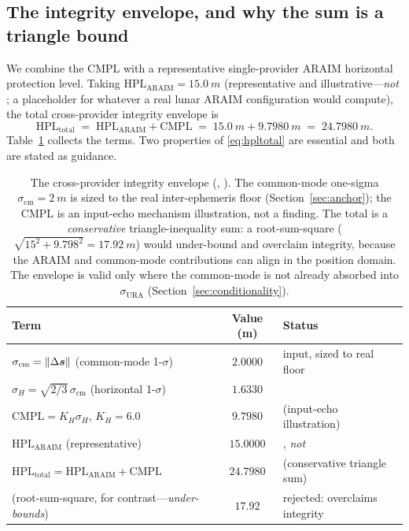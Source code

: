 \subsection{The integrity envelope, and why the sum is a triangle bound}
\label{sec:envelope}

We combine the CMPL with a representative single-provider ARAIM horizontal protection
level. Taking $\mathrm{HPL}_{\mathrm{ARAIM}}=\SI{15.0}{m}$ (representative and
illustrative---\emph{not} \Validated{}; a placeholder for whatever a real lunar ARAIM
configuration would compute), the total cross-provider integrity envelope is
\begin{equation}
  \mathrm{HPL}_{\mathrm{total}}
  \;=\; \mathrm{HPL}_{\mathrm{ARAIM}} + \mathrm{CMPL}
  \;=\; \SI{15.0}{m} + \SI{9.7980}{m}
  \;=\; \SI{24.7980}{m}.
  \label{eq:hpltotal}
\end{equation}
Table~\ref{tab:envelope} collects the terms. Two properties of \eqref{eq:hpltotal} are
essential and both are stated as \Modelled{} guidance.

\begin{table}[t]
\centering
\caption{The cross-provider integrity envelope (\Modelled{}, \modtag{}). The
common-mode one-sigma $\sigma_{\mathrm{cm}}=\SI{2}{m}$ is sized to the real
inter-ephemeris floor (Section~\ref{sec:anchor}); the CMPL is an input-echo mechanism
illustration, not a finding. The total is a \emph{conservative} triangle-inequality sum:
a root-sum-square ($\sqrt{15^2+9.798^2}=\SI{17.92}{m}$) would under-bound and overclaim
integrity, because the ARAIM and common-mode contributions can align in the position
domain. The envelope is valid only where the common-mode is not already absorbed into
$\sigma_{\mathrm{URA}}$ (Section~\ref{sec:conditionality}).}
\label{tab:envelope}
\small
\begin{tabular}{@{}lcl@{}}
\toprule
\textbf{Term} & \textbf{Value (m)} & \textbf{Status} \\
\midrule
$\sigma_{\mathrm{cm}}=\|\Delta\bm{s}\|$ (common-mode 1-$\sigma$) & $2.0000$ & \Modelled{} input, sized to real floor \\
$\sigma_H=\sqrt{2/3}\,\sigma_{\mathrm{cm}}$ (horizontal 1-$\sigma$)   & $1.6330$ & \Modelled{} \\
$\mathrm{CMPL}=K_H\sigma_H$, $K_H=6.0$    & $9.7980$ & \Modelled{} (input-echo illustration) \\
$\mathrm{HPL}_{\mathrm{ARAIM}}$ (representative)          & $15.0000$ & \Modelled{}, \emph{not} \Validated{} \\
$\mathrm{HPL}_{\mathrm{total}}=\mathrm{HPL}_{\mathrm{ARAIM}}+\mathrm{CMPL}$ & $24.7980$ & \Modelled{} (conservative triangle sum) \\
\midrule
(root-sum-square, for contrast---\emph{under-bounds}) & $17.92$ & rejected: overclaims integrity \\
\bottomrule
\end{tabular}
\end{table}


